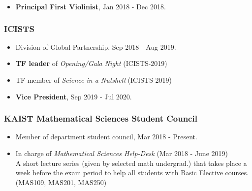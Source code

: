 \documentclass[10pt,a4]{article}
\begin{document}
\begin{small}
\begin{itemize}
	\item {\bf Principal First Violinist}, Jan 2018 - Dec 2018.
	
\end{itemize}

\subsubsection*{ICISTS}
\begin{itemize}
	\item Division of Global Partnership, Sep 2018 - Aug 2019.
	
	\item {\bf TF leader} of {\it Opening/Gala Night} (ICISTS-2019)
	
	\item TF member of {\it Science in a Nutshell} (ICISTS-2019)
	
	\item {\bf Vice President}, Sep 2019 - Jul 2020.
	
	
\end{itemize}

%	

\subsubsection*{KAIST Mathematical Sciences Student Council}
\begin{itemize}
	\item Member of department student council, Mar 2018 - Present.
	
	\item In charge of {\it Mathematical Sciences Help-Desk} (Mar 2018 - June 2019) \\
	A short lecture series (given by selected math undergrad.) that takes place a week before the exam period to help all students with Basic Elective courses. (MAS109, MAS201, MAS250)
\end{itemize}

\newpage
\pagestyle{fancy}
\lhead{\textcolor{gray}{\it Junghyun Lee}}
\fancyfoot[C]{}


\end{small}
\end{document}
